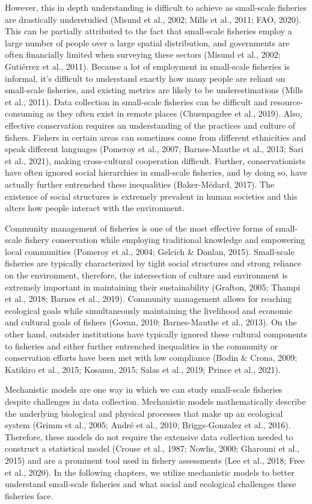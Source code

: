 \documentclass[
  12pt,
]{article}
\begin{document}
However, this in depth understanding is difficult to achieve as small-scale fisheries are drastically understudied (Misund et al., 2002; Mills et al., 2011; FAO, 2020). This can be partially attributed to the fact that small-scale fisheries employ a large number of people over a large spatial distribution, and governments are often financially limited when surveying these sectors (Misund et al., 2002; Gutiérrez et al., 2011). Because a lot of employment in small-scale fisheries is informal, it's difficult to understand exactly how many people are reliant on small-scale fisheries, and existing metrics are likely to be underestimations (Mills et al., 2011). Data collection in small-scale fisheries can be difficult and resource-consuming as they often exist in remote places (Chuenpagdee et al., 2019). Also, effective conservation requires an understanding of the practices and culture of fishers. Fishers in certain areas can sometimes come from different ethnicities and speak different languages (Pomeroy et al., 2007; Barnes-Mauthe et al., 2013; Sari et al., 2021), making cross-cultural cooperation difficult. Further, conservationists have often ignored social hierarchies in small-scale fisheries, and by doing so, have actually further entrenched these inequalities (Baker-Médard, 2017). The existence of social structures is extremely prevalent in human societies and this alters how people interact with the environment.

Community management of fisheries is one of the most effective forms of small-scale fishery conservation while employing traditional knowledge and empowering local communities (Pomeroy et al., 2004; Gelcich \& Donlan, 2015). Small-scale fisheries are typically characterized by tight social structures and strong reliance on the environment, therefore, the intersection of culture and environment is extremely important in maintaining their sustainability (Grafton, 2005; Thampi et al., 2018; Barnes et al., 2019). Community management allows for reaching ecological goals while simultaneously maintaining the livelihood and economic and cultural goals of fishers (Govan, 2010; Barnes-Mauthe et al., 2013). On the other hand, outsider institutions have typically ignored these cultural components to fisheries and either further entrenched inequalities in the community or conservation efforts have been met with low compliance (Bodin \& Crona, 2009; Katikiro et al., 2015; Kosamu, 2015; Salas et al., 2019; Prince et al., 2021).

Mechanistic models are one way in which we can study small-scale fisheries despite challenges in data collection. Mechanistic models mathematically describe the underlying biological and physical processes that make up an ecological system (Grimm et al., 2005; André et al., 2010; Briggs-Gonzalez et al., 2016). Therefore, these models do not require the extensive data collection needed to construct a statistical model (Crouse et al., 1987; Nowlis, 2000; Gharouni et al., 2015) and are a prominent tool used in fishery assessments (Lee et al., 2018; Free et al., 2020). In the following chapters, we utilize mechanistic models to better understand small-scale fisheries and what social and ecological challenges these fisheries face.
\end{document}
